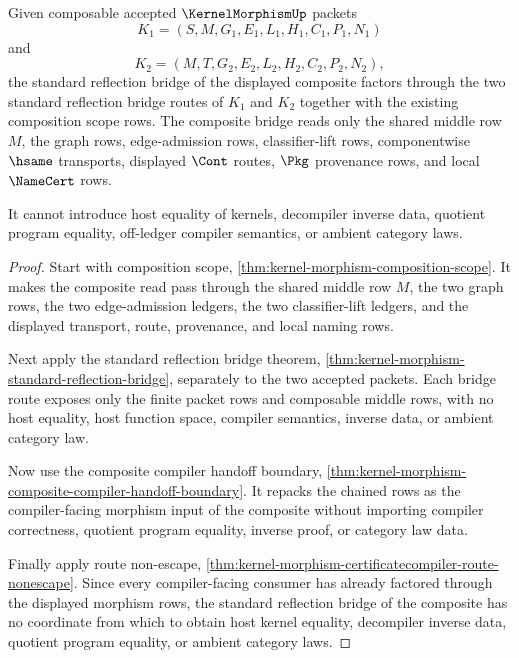 \begin{theorem}
\label{thm:kernel-morphism-composition-standard-reflection-compatibility}
Given composable accepted $\KernelMorphismUp$ packets
$$
K_{1}=(S,M,G_{1},E_{1},L_{1},H_{1},C_{1},P_{1},N_{1})
$$
and
$$
K_{2}=(M,T,G_{2},E_{2},L_{2},H_{2},C_{2},P_{2},N_{2}),
$$
the standard reflection bridge of the displayed composite factors through the two standard reflection bridge routes of $K_{1}$ and $K_{2}$ together with the existing composition scope rows. The composite bridge reads only the shared middle row $M$, the graph rows, edge-admission rows, classifier-lift rows, componentwise $\hsame$ transports, displayed $\Cont$ routes, $\Pkg$ provenance rows, and local $\NameCert$ rows.

It cannot introduce host equality of kernels, decompiler inverse data, quotient program equality, off-ledger compiler semantics, or ambient category laws.
\end{theorem}
\begin{proof}
Start with composition scope, \autoref{thm:kernel-morphism-composition-scope}. It makes the composite read pass through the shared middle row $M$, the two graph rows, the two edge-admission ledgers, the two classifier-lift ledgers, and the displayed transport, route, provenance, and local naming rows.

Next apply the standard reflection bridge theorem, \autoref{thm:kernel-morphism-standard-reflection-bridge}, separately to the two accepted packets. Each bridge route exposes only the finite packet rows and composable middle rows, with no host equality, host function space, compiler semantics, inverse data, or ambient category law.

Now use the composite compiler handoff boundary, \autoref{thm:kernel-morphism-composite-compiler-handoff-boundary}. It repacks the chained rows as the compiler-facing morphism input of the composite without importing compiler correctness, quotient program equality, inverse proof, or category law data.

Finally apply route non-escape, \autoref{thm:kernel-morphism-certificatecompiler-route-nonescape}. Since every compiler-facing consumer has already factored through the displayed morphism rows, the standard reflection bridge of the composite has no coordinate from which to obtain host kernel equality, decompiler inverse data, quotient program equality, or ambient category laws.
\end{proof}

